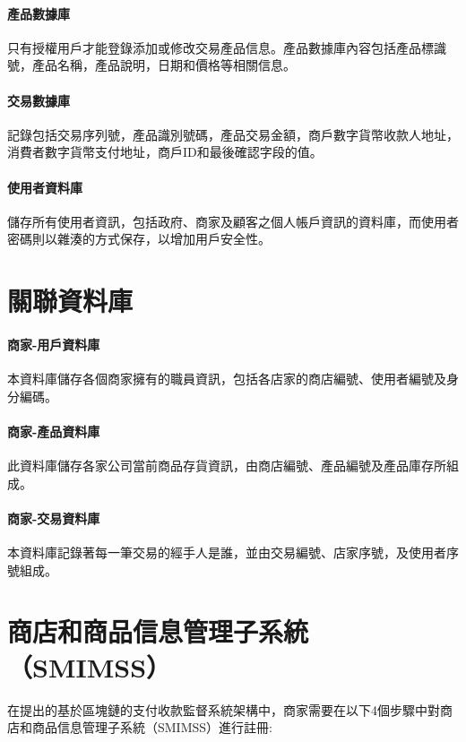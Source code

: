 			\paragraph{產品數據庫}只有授權用戶才能登錄添加或修改交易產品信息。產品數據庫內容包括產品標識號，產品名稱，產品說明，日期和價格等相關信息。
			\paragraph{交易數據庫}記錄包括交易序列號，產品識別號碼，產品交易金額，商戶數字貨幣收款人地址，消費者數字貨幣支付地址，商戶ID和最後確認字段的值。
			\paragraph{使用者資料庫}儲存所有使用者資訊，包括政府、商家及顧客之個人帳戶資訊的資料庫，而使用者密碼則以雜湊的方式保存，以增加用戶安全性。

		\section{關聯資料庫}
		\paragraph{商家-用戶資料庫}本資料庫儲存各個商家擁有的職員資訊，包括各店家的商店編號、使用者編號及身分編碼。
		\paragraph{商家-產品資料庫}此資料庫儲存各家公司當前商品存貨資訊，由商店編號、產品編號及產品庫存所組成。
		\paragraph{商家-交易資料庫}本資料庫記錄著每一筆交易的經手人是誰，並由交易編號、店家序號，及使用者序號組成。

	\section{商店和商品信息管理子系統（SMIMSS）}
	在提出的基於區塊鏈的支付收款監督系統架構中，商家需要在以下4個步驟中對商店和商品信息管理子系統（SMIMSS）進行註冊:

